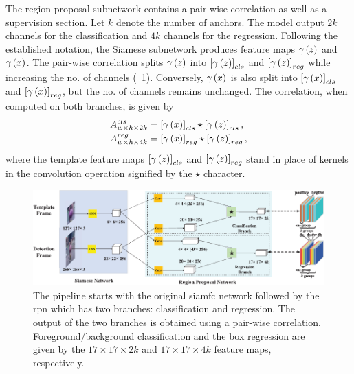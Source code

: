 The region proposal subnetwork contains a pair-wise correlation as well as a supervision section. Let $k$ denote the number of anchors. The model output $2k$ channels for the classification and $4k$ channels for the regression. Following the established notation, the Siamese subnetwork produces feature maps ${\gamma} \left( z \right)$ and ${\gamma} \left( x \right)$. The pair-wise correlation splits ${\gamma} \left( z \right)$ into $\left[ {{\gamma} \left( z \right)} \right]_{cls}$ and $\left[ {{\gamma} \left( z \right)} \right]_{reg}$ while increasing the no. of channels (\figtext{}~\ref{fig:SiamRPNNetArchitecture}). Conversely, ${\gamma} \left( x \right)$ is also split into $\left[ {{\gamma} \left( x \right)} \right]_{cls}$ and $\left[ {{\gamma} \left( x \right)} \right]_{reg}$, but the no. of channels remains unchanged. The correlation, when computed on both branches, is given by
\begin{equation}
    \begin{aligned}
        {A}_{w \times h \times 2k}^{cls} & =
        \left[ {{\gamma} \left( x \right)} \right]_{cls} \star \left[ {{\gamma} \left( z \right)} \right]_{cls}, \\
        {A}_{w \times h \times 4k}^{reg} & =
        \left[ {{\gamma} \left( x \right)} \right]_{reg} \star \left[ {{\gamma} \left( z \right)} \right]_{reg},
    \end{aligned}
\end{equation}
where the template feature maps $\left[ {{\gamma} \left( z \right)} \right]_{cls}$ and $\left[ {{\gamma} \left( z \right)} \right]_{reg}$ stand in place of kernels in the convolution operation signified by the $\star$ character.

\begin{figure}[t]
    \centerline{\includegraphics[width=\linewidth]{figures/theoretical_foundations/siam_rpn_architecture.pdf}}
    \caption[\gls{siamrpn} architecture]{The pipeline starts with the original \gls{siamfc} network followed by the \gls{rpn} which has two branches: classification and regression. The output of the two branches is obtained using a pair-wise correlation. Foreground/background classification and the box regression are given by the $17 \times 17 \times 2k$ and $17 \times 17 \times 4k$ feature maps, respectively. }
    \label{fig:SiamRPNNetArchitecture}
\end{figure}

